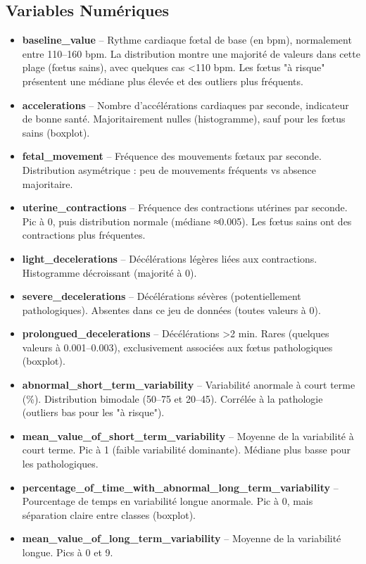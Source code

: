 \documentclass[twocolumn,10pt]{article}
\begin{document}
\subsection{Variables Numériques}
\begin{itemize}
    \item \textbf{baseline\_value} – Rythme cardiaque fœtal de base (en bpm), normalement entre 110--160 bpm. La distribution montre une majorité de valeurs dans cette plage (fœtus sains), avec quelques cas <110 bpm. Les fœtus "à risque" présentent une médiane plus élevée et des outliers plus fréquents.

    \item \textbf{accelerations} – Nombre d’accélérations cardiaques par seconde, indicateur de bonne santé. Majoritairement nulles (histogramme), sauf pour les fœtus sains (boxplot).

    \item \textbf{fetal\_movement} – Fréquence des mouvements fœtaux par seconde. Distribution asymétrique : peu de mouvements fréquents vs absence majoritaire.

    \item \textbf{uterine\_contractions} – Fréquence des contractions utérines par seconde. Pic à 0, puis distribution normale (médiane ≈0.005). Les fœtus sains ont des contractions plus fréquentes.

    \item \textbf{light\_decelerations} – Décélérations légères liées aux contractions. Histogramme décroissant (majorité à 0).

    \item \textbf{severe\_decelerations} – Décélérations sévères (potentiellement pathologiques). Absentes dans ce jeu de données (toutes valeurs à 0).

    \item \textbf{prolongued\_decelerations} – Décélérations >2 min. Rares (quelques valeurs à 0.001--0.003), exclusivement associées aux fœtus pathologiques (boxplot).

    \item \textbf{abnormal\_short\_term\_variability} – Variabilité anormale à court terme (\%). Distribution bimodale (50--75 et 20--45). Corrélée à la pathologie (outliers bas pour les "à risque").

    \item \textbf{mean\_value\_of\_short\_term\_variability} – Moyenne de la variabilité à court terme. Pic à 1 (faible variabilité dominante). Médiane plus basse pour les pathologiques.

    \item \textbf{percentage\_of\_time\_with\_abnormal\_long\_term\_variability} – Pourcentage de temps en variabilité longue anormale. Pic à 0, mais séparation claire entre classes (boxplot).

    \item \textbf{mean\_value\_of\_long\_term\_variability} – Moyenne de la variabilité longue. Pics à 0 et 9.
\end{itemize}
\end{document}
